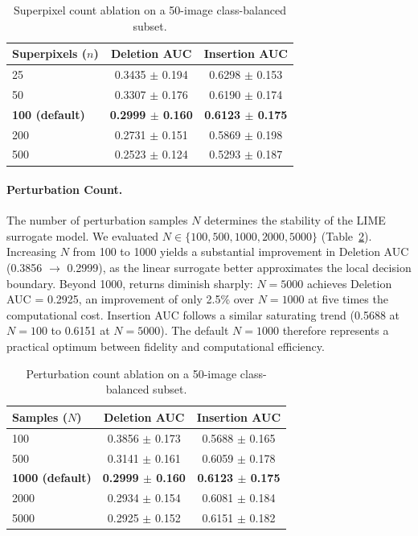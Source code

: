 \documentclass[10pt,twoside]{article}
\begin{document}
\begin{table}[ht]
\caption{Superpixel count ablation on a 50-image class-balanced subset.}
\centering
\label{tab:ablation_sp}
\begin{tabular}{lcc}
\toprule
Superpixels ($n$) & Deletion AUC & Insertion AUC \\
\midrule
25 & 0.3435 $\pm$ 0.194 & 0.6298 $\pm$ 0.153 \\
50 & 0.3307 $\pm$ 0.176 & 0.6190 $\pm$ 0.174 \\
\textbf{100 (default)} & \textbf{0.2999 $\pm$ 0.160} & \textbf{0.6123 $\pm$ 0.175} \\
200 & 0.2731 $\pm$ 0.151 & 0.5869 $\pm$ 0.198 \\
500 & 0.2523 $\pm$ 0.124 & 0.5293 $\pm$ 0.187 \\
\bottomrule
\end{tabular}
\end{table}

\paragraph{Perturbation Count.}
The number of perturbation samples $N$ determines the stability of the LIME surrogate model. We evaluated $N \in \{100, 500, 1000, 2000, 5000\}$ (Table~\ref{tab:ablation_pert}). Increasing $N$ from 100 to 1000 yields a substantial improvement in Deletion AUC (0.3856 $\rightarrow$ 0.2999), as the linear surrogate better approximates the local decision boundary. Beyond 1000, returns diminish sharply: $N = 5000$ achieves Deletion AUC = 0.2925, an improvement of only 2.5\% over $N = 1000$ at five times the computational cost. Insertion AUC follows a similar saturating trend (0.5688 at $N = 100$ to 0.6151 at $N = 5000$). The default $N = 1000$ therefore represents a practical optimum between fidelity and computational efficiency.

\begin{table}[ht]
\caption{Perturbation count ablation on a 50-image class-balanced subset.}
\centering
\label{tab:ablation_pert}
\begin{tabular}{lcc}
\toprule
Samples ($N$) & Deletion AUC & Insertion AUC \\
\midrule
100 & 0.3856 $\pm$ 0.173 & 0.5688 $\pm$ 0.165 \\
500 & 0.3141 $\pm$ 0.161 & 0.6059 $\pm$ 0.178 \\
\textbf{1000 (default)} & \textbf{0.2999 $\pm$ 0.160} & \textbf{0.6123 $\pm$ 0.175} \\
2000 & 0.2934 $\pm$ 0.154 & 0.6081 $\pm$ 0.184 \\
5000 & 0.2925 $\pm$ 0.152 & 0.6151 $\pm$ 0.182 \\
\bottomrule
\end{tabular}
\end{table}
\end{document}
